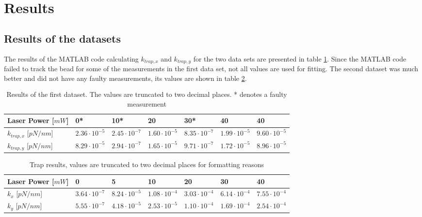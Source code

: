 \section{Results}
\subsection{Results of the datasets}
The results of the MATLAB code calculating $k_{trap,x}$ and $k_{trap,y}$ for the two data sets are presented in table \ref{tab:first-results}. Since the MATLAB code failed to track the bead for some of the measurements in the first data set, not all values are used for fitting. The second dataset was much better and did not have any faulty measurements, its values are shown in table \ref{tab:second-results}.\\

\vspace{-.2cm}
\begin{table}[h!]
\centering
\begin{tabular}{|l|l|l|l|l|l|l|}
\hline
Laser Power {[}$mW${]} & 0*         & 10*        & 20        & 30*        & 40         & 40        \\ \hline
$k_{trap,x}$    {[}$pN/nm${]}        & $2.36 \cdot 10^{-5}$ &$ 2.45 \cdot 10^{-7}$ & $1.60\cdot 10^{-5}$  & $8.35\cdot 10^{-7}$ & $1.99\cdot 10^{-5}$  & $9.60\cdot 10^{-5}$ \\ \hline
$k_{trap,y}$     {[}$pN/nm${]}       & $8.29 \cdot 10^{-5}$ &$ 2.94\cdot 10^{-7}$ & $1.65\cdot 10^{-5}$ & $9.71\cdot 10^{-7}$ & $1.72\cdot 10^{-5}$ & $8.96\cdot 10^{-5}$ \\ \hline
\end{tabular}
\caption{Results of the first dataset. The values are truncated to two decimal places. * denotes a faulty measurement}
\label{tab:first-results}
\end{table}


\vspace{-.2cm}
\begin{table}[h!]
\centering
    \begin{tabular}{|l|l|l|l|l|l|l|}
        \hline
        Laser Power {[}$mW${]} & 0         & 5         & 10         & 20         & 30         & 40         \\ \hline
        $k_x$     {[}$pN/nm${]}       & $3.64\cdot 10^{-7}$ & $8.24\cdot 10^{-5}$ & $1.08\cdot 10^{-4}$ & $3.03\cdot 10^{-4}$ & $6.14\cdot 10^{-4}$ & $7.55\cdot 10^{-4}$ \\ \hline
        $k_y$     {[}$pN/nm${]}       & $5.55\cdot 10^{-7}$   & $4.18\cdot 10^{-5}$ & $2.53\cdot 10^{-5}$  & $1.10\cdot 10^{-4}$ & $1.69\cdot 10^{-4}$ & $2.54\cdot 10^{-4}$ \\ \hline
    \end{tabular}
\caption{Trap results, values are truncated to two decimal places for formatting reasons}
\label{tab:second-results}
\end{table}


